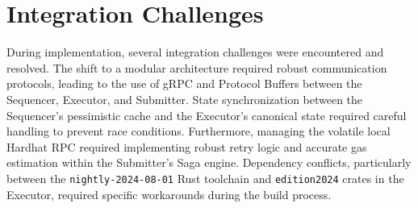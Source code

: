 \section{Integration Challenges}
\label{sec:integration_challenges}
During implementation, several integration challenges were encountered and resolved. The shift to a modular architecture required robust communication protocols, leading to the use of gRPC and Protocol Buffers between the Sequencer, Executor, and Submitter. State synchronization between the Sequencer's pessimistic cache and the Executor's canonical state required careful handling to prevent race conditions. Furthermore, managing the volatile local Hardhat RPC required implementing robust retry logic and accurate gas estimation within the Submitter's Saga engine. Dependency conflicts, particularly between the \texttt{nightly-2024-08-01} Rust toolchain and \texttt{edition2024} crates in the Executor, required specific workarounds during the build process.